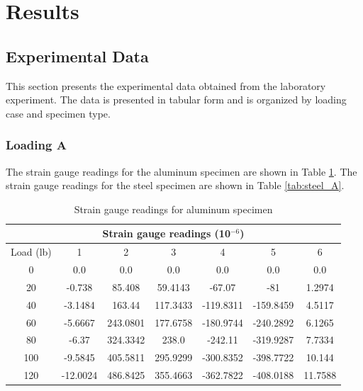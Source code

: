 \documentclass[12pt, titlepage]{article}
\begin{document}
\section{Results}

\subsection{Experimental Data}
This section presents the experimental data obtained from the laboratory
experiment. The data is presented in tabular form and is organized by loading
case and specimen type.
\subsubsection{Loading A}
The strain gauge readings for the aluminum specimen are shown in Table \ref{tab:alu_A}.
The strain gauge readings for the steel specimen are shown in Table \ref{tab:steel_A}.
\begin{table}[H]
\begin{tabular}{|c|c|c|c|c|c|c|} \hline
\multicolumn{7}{|c|}{Strain gauge readings (10$^{-6}$)} \\ \hline
Load (lb) & 1 & 2 & 3 & 4 & 5 & 6 \\ \hline
0 & 0.0 & 0.0 & 0.0 & 0.0 & 0.0 & 0.0 \\ \hline
20 & -0.738 & 85.408 & 59.4143 & -67.07 & -81 & 1.2974 \\ \hline
40 & -3.1484 & 163.44 & 117.3433 & -119.8311 & -159.8459 & 4.5117 \\ \hline
60 & -5.6667 & 243.0801 & 177.6758 & -180.9744 & -240.2892 & 6.1265 \\ \hline
80 & -6.37 & 324.3342 & 238.0 & -242.11 & -319.9287 & 7.7334 \\ \hline
100 & -9.5845 & 405.5811 & 295.9299 & -300.8352 & -398.7722 & 10.144 \\ \hline
120 & -12.0024 & 486.8425 & 355.4663 & -362.7822 & -408.0188 & 11.7588 \\ \hline
\end{tabular}
\captionsetup{justification=raggedright,singlelinecheck=false}
\caption{Strain gauge readings for aluminum specimen}
\label{tab:alu_A}
\end{table}
\end{document}
